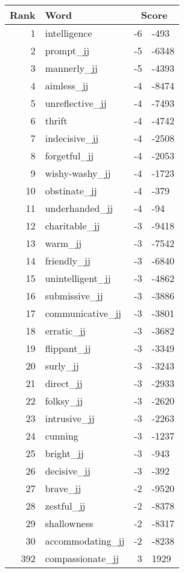 \begin{longtable}[!htbp]{| rlr@{.}l |}
    \hline
    \textbf{Rank} & \textbf{Word} & \multicolumn{2}{c|}{\textbf{Score}} \\
    \hline
    \endhead
    1 & intelligence & -6 & -493 \\
    2 & prompt\_jj & -5 & -6348 \\
    3 & mannerly\_jj & -5 & -4393 \\
    4 & aimless\_jj & -4 & -8474 \\
    5 & unreflective\_jj & -4 & -7493 \\
    6 & thrift & -4 & -4742 \\
    7 & indecisive\_jj & -4 & -2508 \\
    8 & forgetful\_jj & -4 & -2053 \\
    9 & wishy-washy\_jj & -4 & -1723 \\
    10 & obstinate\_jj & -4 & -379 \\
    11 & underhanded\_jj & -4 & -94 \\
    12 & charitable\_jj & -3 & -9418 \\
    13 & warm\_jj & -3 & -7542 \\
    14 & friendly\_jj & -3 & -6840 \\
    15 & unintelligent\_jj & -3 & -4862 \\
    16 & submissive\_jj & -3 & -3886 \\
    17 & communicative\_jj & -3 & -3801 \\
    18 & erratic\_jj & -3 & -3682 \\
    19 & flippant\_jj & -3 & -3349 \\
    20 & surly\_jj & -3 & -3243 \\
    21 & direct\_jj & -3 & -2933 \\
    22 & folksy\_jj & -3 & -2620 \\
    23 & intrusive\_jj & -3 & -2263 \\
    24 & cunning & -3 & -1237 \\
    25 & bright\_jj & -3 & -943 \\
    26 & decisive\_jj & -3 & -392 \\
    27 & brave\_jj & -2 & -9520 \\
    28 & zestful\_jj & -2 & -8378 \\
    29 & shallowness & -2 & -8317 \\
    30 & accommodating\_jj & -2 & -8238 \\
    392 & compassionate\_jj & 3 & 1929 \\

\end{longtable}
